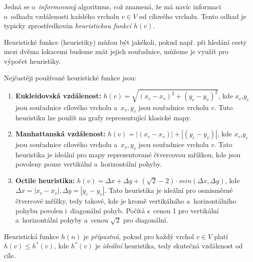 \documentclass[12pt]{report}			%
\begin{document}
			Jedná se o~\emph{informovaný} algoritmus, což znamená, že má navíc informaci o~odhadu vzdálenosti každého vrcholu $v \in V$ od cílového vrcholu. 
			Tento odhad je typicky zprostředkován \emph{heuristickou funkcí $h(v)$}.
			
			Heuristické funkce (heuristiky) můžou být jakékoli, pokud např. při hledání cesty mezi dvěma lokacemi budeme znát jejich souřadnice, můžeme je využít pro výpočet heuristiky. %

			Nejčastěji používané heuristické funkce jsou:
			\begin{enumerate}
			
\item \textbf{Eukleidovská vzdálenost:} $h(v) = \sqrt{(x_c - x_v)^2 + (y_c - y_v)^2}$, kde $x_c$,$y_c$ jsou souřadnice cílového vrcholu a~$x_v, y_v$ jsou souřadnice vrcholu $v$. Tuto heuristiku lze použít na grafy reprezentující klasické mapy.

\item \textbf{Manhattanská vzdálenost:} $h(v) = |(x_c - x_v)| +
|(y_c - y_v)|$, kde $x_c$,$y_c$ jsou souřadnice cílového vrcholu a~$x_v, y_v$ jsou souřadnice vrcholu $v$. Tato heuristika je ideální pro mapy reprezentované čtvercovou mřížkou, kde jsou povoleny pouze vertikální a~horizontální pohyby.

\item \textbf{Octile heuristika:} $h(v) = \Delta x+ \Delta y + (\sqrt{2}-2) \cdot min(\Delta x, \Delta y)$, kde $\Delta x = |x_c - x_v|, \Delta y = |y_c - y_v|$. %
Tato heuristika je ideální pro osmisměrné čtvercové mřížky, tedy takové, kde je kromě vertikálního a~horizontálního pohybu povolen i~diagonální pohyb. Počítá s~cenou 1 pro vertikální a~horizontální pohyby a~cenou $\sqrt{2}$ pro diagonální.
\end{enumerate}
Heuristická funkce $h(n)$ je \emph{přípustná}, pokud pro každý vrchol $v \in V$ platí $h(v) \leq h^*(v)$, kde $h^*(v)$ je \emph{ideální} heuristika, tedy skutečná vzdálenost od cíle.
			
\end{document}
